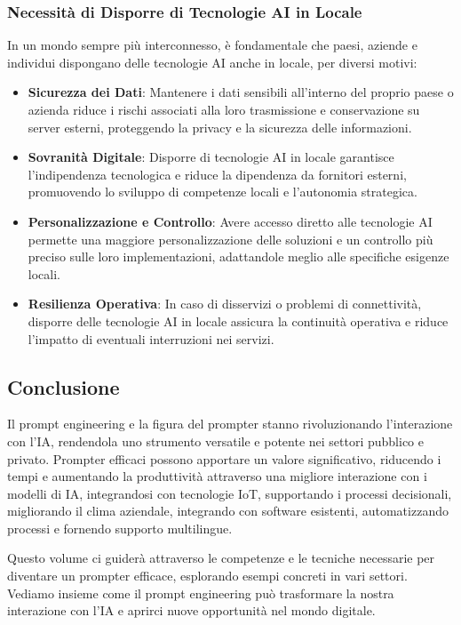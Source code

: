         \subsubsection{Necessità di Disporre di Tecnologie AI in Locale}
            In un mondo sempre più interconnesso, è fondamentale che paesi, aziende e individui dispongano delle tecnologie AI anche in locale, per diversi motivi:
            \begin{itemize}
                \item \textbf{Sicurezza dei Dati}: Mantenere i dati sensibili all'interno del proprio paese o azienda riduce i rischi associati alla loro trasmissione e conservazione su server esterni, proteggendo la privacy e la sicurezza delle informazioni.
    
                \item \textbf{Sovranità Digitale}: Disporre di tecnologie AI in locale garantisce l'indipendenza tecnologica e riduce la dipendenza da fornitori esterni, promuovendo lo sviluppo di competenze locali e l'autonomia strategica.
    
                \item \textbf{Personalizzazione e Controllo}: Avere accesso diretto alle tecnologie AI permette una maggiore personalizzazione delle soluzioni e un controllo più preciso sulle loro implementazioni, adattandole meglio alle specifiche esigenze locali.
    
                \item \textbf{Resilienza Operativa}: In caso di disservizi o problemi di connettività, disporre delle tecnologie AI in locale assicura la continuità operativa e riduce l'impatto di eventuali interruzioni nei servizi.
            \end{itemize}
        
    \subsection{Conclusione}
        Il prompt engineering e la figura del prompter stanno rivoluzionando l'interazione con l'IA, rendendola uno strumento versatile e potente nei settori pubblico e privato. Prompter efficaci possono apportare un valore significativo, riducendo i tempi e aumentando la produttività attraverso una migliore interazione con i modelli di IA, integrandosi con tecnologie IoT, supportando i processi decisionali, migliorando il clima aziendale, integrando con software esistenti, automatizzando processi e fornendo supporto multilingue.
    
        Questo volume ci guiderà attraverso le competenze e le tecniche necessarie per diventare un prompter efficace, esplorando esempi concreti in vari settori. Vediamo insieme come il prompt engineering può trasformare la nostra interazione con l'IA e aprirci nuove opportunità nel mondo digitale.
